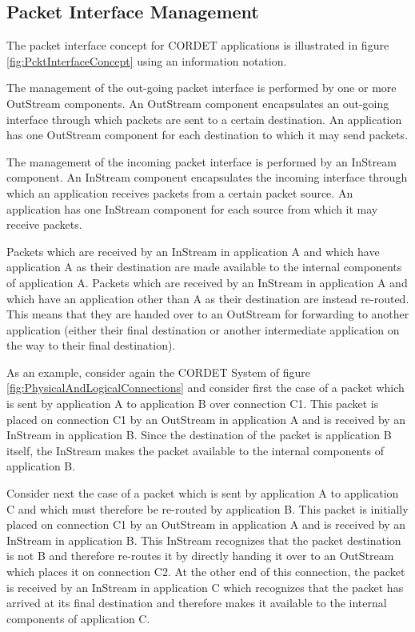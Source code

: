 \documentclass{pnp_article}
\begin{document}
\subsection{Packet Interface Management}

The packet interface concept for CORDET applications is illustrated in figure \ref{fig:PcktInterfaceConcept} using an information notation.

The management of the out-going packet interface is performed by one or more OutStream components. An OutStream component encapsulates an out-going interface through which packets are sent to a certain destination. An application has one OutStream component for each destination to which it may send packets.

The management of the incoming packet interface is performed by an InStream component. An InStream component encapsulates the incoming interface through which an application receives packets from a certain packet source. An application has one InStream component for each source from which it may receive packets.

Packets which are received by an InStream in application A and which have application A as their destination are made available to the internal components of application A. Packets which are received by an InStream in application A and which have an application other than A as their destination are instead re-routed. This means that they are handed over to an OutStream for forwarding to another application (either their final destination or another intermediate application on the way to their final destination).

As an example, consider again the CORDET System of figure \ref{fig:PhysicalAndLogicalConnections} and consider first the case of a packet which is sent by application A to application B over connection C1. This packet is placed on connection C1 by an OutStream in application A and is received by an InStream in application B. Since the destination of the packet is application B itself, the InStream makes the packet available to the internal components of application B.

Consider next the case of a packet which is sent by application A to application C and which must therefore be re-routed by application B. This packet is initially placed on connection C1 by an OutStream in application A and is received by an InStream in application B. This InStream recognizes that the packet destination is not B and therefore re-routes it by directly handing it over to an OutStream which places it on connection C2. At the other end of this connection, the packet is received by an InStream in application C which recognizes that the packet has arrived at its final destination and therefore makes it available to the internal components of application C. 
\end{document}
